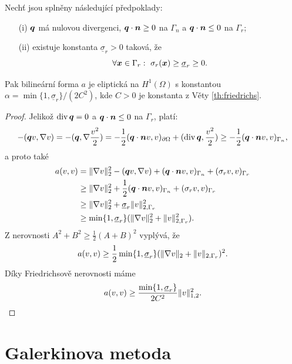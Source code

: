 \begin{veta}
Nechť jsou splněny následující předpoklady:
\begin{itemize}
\item[(i)] $\mathbf{\boldsymbol{q}}$ má nulovou divergenci, $\mathbf{\boldsymbol{q}}\cdot\mathbf{\boldsymbol{n}}\ge 0$ na $\Gamma_n$ a $\mathbf{\boldsymbol{q}}\cdot\mathbf{\boldsymbol{n}}\le 0$ na $\Gamma_r$;
\item[(ii)] existuje konstanta $\underline\sigma_r>0$ taková, že
\[ \forall\mathbf{\boldsymbol{x}}\in\Gamma_r:~\sigma_r(\mathbf{\boldsymbol{x}})\ge\underline\sigma_r\ge 0. \]
\end{itemize}
Pak bilineární forma $a$ je eliptická na $H^1(\Omega)$ s konstantou $\alpha=\min\{1,\underline\sigma_r\}/(2C^2)$, kde $C>0$ je konstanta z Věty \ref{th:friedrichs}.
\end{veta}
\begin{proof}
Jelikož $\operatorname{div}\mathbf{\boldsymbol{q}}=0$ a $\mathbf{\boldsymbol{q}}\cdot\mathbf{\boldsymbol{n}}\le 0$ na $\Gamma_r$, platí:
\[ -(\mathbf{\boldsymbol{q}} v,\nabla v) = -(\mathbf{\boldsymbol{q}},\nabla\frac{v^2}2) = -\frac12(\mathbf{\boldsymbol{q}}\cdot\mathbf{\boldsymbol{n}} v,v)_{\partial\Omega} +(\operatorname{div}\mathbf{\boldsymbol{q}},\frac{v^2}2) \ge -\frac12(\mathbf{\boldsymbol{q}}\cdot\mathbf{\boldsymbol{n}} v,v)_{\Gamma_n}, \]
a proto také
\begin{align*}
a(v,v) & = \|\nabla v\|_2^2 - (\mathbf{\boldsymbol{q}} v,\nabla v) + (\mathbf{\boldsymbol{q}}\cdot\mathbf{\boldsymbol{n}} v,v)_{\Gamma_n} + (\sigma_r v,v)_{\Gamma_r}\\
&\ge \|\nabla v\|_2^2 + \frac12 (\mathbf{\boldsymbol{q}}\cdot\mathbf{\boldsymbol{n}} v,v)_{\Gamma_n} + (\sigma_r v,v)_{\Gamma_r}\\
&\ge \|\nabla v\|_2^2 + \underline\sigma_r\|v\|_{2,\Gamma_r}^2\\
&\ge \min\{1,\underline\sigma_r\}(\|\nabla v\|_2^2 + \|v\|_{2,\Gamma_r}^2).
\end{align*}
Z nerovnosti $A^2+B^2\ge \frac12(A+B)^2$ vyplývá, že
\[ a(v,v) \ge \frac12\min\{1,\underline\sigma_r\}(\|\nabla v\|_2 + \|v\|_{2,\Gamma_r})^2. \]
Díky Friedrichsově nerovnosti máme
\[ a(v,v) \ge \frac{\min\{1,\underline\sigma_r\}}{2C^2}\| v\|_{1,2}^2. \]
\end{proof}








\section{Galerkinova metoda}


